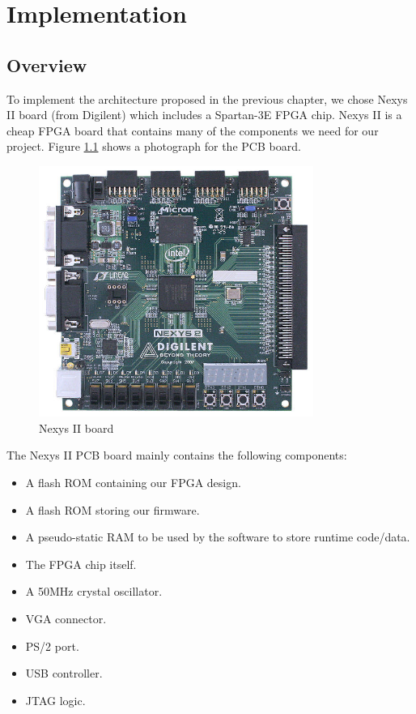 \documentclass[oneside]{book}
\begin{document}

\chapter{Implementation}

\section{Overview}

To implement the architecture proposed in the previous chapter, we chose
Nexys II board (from Digilent) which includes a Spartan-3E FPGA chip.
Nexys II is a cheap FPGA board that contains many of the components
we need for our project. Figure \ref{nexys2} shows a photograph
for the PCB board.

\begin{figure}[H]
\begin{center}
\includegraphics[width=0.8\textwidth]{nexys2.jpg}
\end{center}
\caption{Nexys II board}
\label{nexys2}
\end{figure}

\newpage

The Nexys II PCB board mainly contains the following components:

\begin{itemize}
\item A flash ROM containing our FPGA design.
\item A flash ROM storing our firmware.
\item A pseudo-static RAM to be used by the software to
      store runtime code/data.
\item The FPGA chip itself.
\item A 50MHz crystal oscillator.
\item VGA connector.
\item PS/2 port.
\item USB controller.
\item JTAG logic.
\end{itemize}
\end{document}
